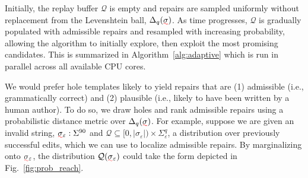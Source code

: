 \documentclass[sigplan,review,anonymous,acmsmall]{acmart}\settopmatter{printfolios=false,printccs=false,printacmref=false}
\begin{document}
\begin{figure}
  \vspace{-10pt}
  \scalebox{0.5}{
  \begin{minipage}{\textwidth}
  
  \end{minipage}
  }
\end{figure}

Initially, the replay buffer $\mathcal{Q}$ is empty and repairs are sampled uniformly without replacement from the Levenshtein ball, $\Delta_{q}(\err{\sigma})$. As time progresses, $\mathcal{Q}$  is gradually populated with admissible repairs and resampled with increasing probability, allowing the algorithm to initially explore, then exploit the most promising candidates. This is summarized in Algorithm~\ref{alg:adaptive} which is run in parallel across all available CPU cores.

We would prefer hole templates likely to yield repairs that are (1) admissible (i.e., grammatically correct) and (2) plausible (i.e., likely to have been written by a human author). To do so, we draw holes and rank admissible repairs using a probabilistic distance metric over $\Delta_q(\err{\sigma})$. For example, suppose we are given an invalid string, $\err{\sigma}_{\varepsilon}: \Sigma^{90}$ and $\mathcal{Q} \subseteq [0, |\sigma_\varepsilon|) \times \Sigma^q_\varepsilon$, a distribution over previously successful edits, which we can use to localize admissible repairs. By marginalizing onto $\err{\sigma}_\varepsilon$, the distribution $\mathcal{Q}(\err{\sigma}_\varepsilon)$ could take the form depicted in Fig.~\ref{fig:prob_reach}.

%
%
\end{document}
